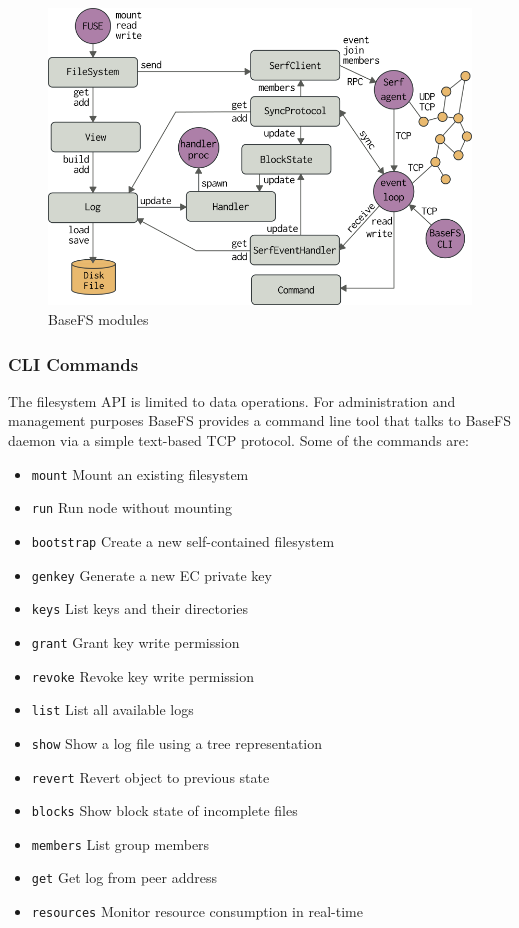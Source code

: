 \documentclass{sig-alternate}
\begin{document}
\begin{figure}
\centering
\includegraphics[width=\columnwidth]{imgs/modules.png}
\caption{BaseFS modules}
\label{fig:modules}
\end{figure}

\subsubsection{CLI Commands}
The filesystem API is limited to data operations. For administration and management purposes BaseFS provides a command line tool that talks to BaseFS daemon via a simple text-based TCP protocol. Some of the commands are:

\begin{itemize}
 \item \texttt{mount}	Mount an existing filesystem
 \item \texttt{run}	Run node without mounting
 \item \texttt{bootstrap}	Create a new self-contained filesystem
 \item \texttt{genkey}	Generate a new EC private key
 \item \texttt{keys}	List keys and their directories
 \item \texttt{grant}	Grant key write permission
 \item \texttt{revoke}	Revoke key write permission
 \item \texttt{list}	List all available logs
 \item \texttt{show}	Show a log file using a tree representation
 \item \texttt{revert}	Revert object to previous state
 \item \texttt{blocks}	Show block state of incomplete files
 \item \texttt{members}	List group members
 \item \texttt{get}		Get log from peer address
 \item \texttt{resources}	Monitor resource consumption in real-time
\end{itemize}
\end{document}
